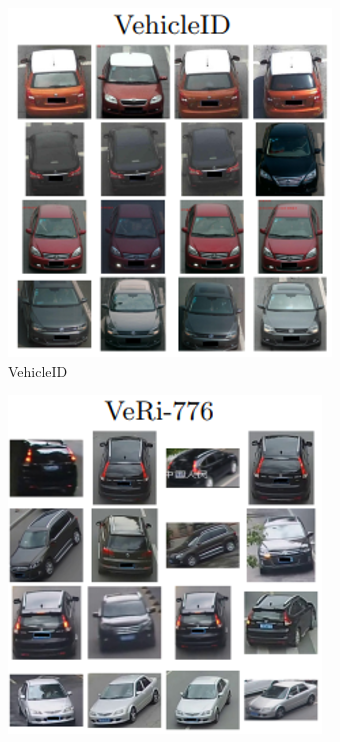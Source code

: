 \begin{figure}[h!]
  \centering
  \begin{subfigure}{.33\textwidth}
    \centering
    \includegraphics[width=.9\linewidth]{gambar/VehicleID.png}
    \caption{VehicleID}
    \label{fig:Vehicleid}
  \end{subfigure}%
  \begin{subfigure}{.33\textwidth}
    \centering
    \includegraphics[width=.9\linewidth]{gambar/Veri-776.png}

\end{subfigure}
\end{figure}
